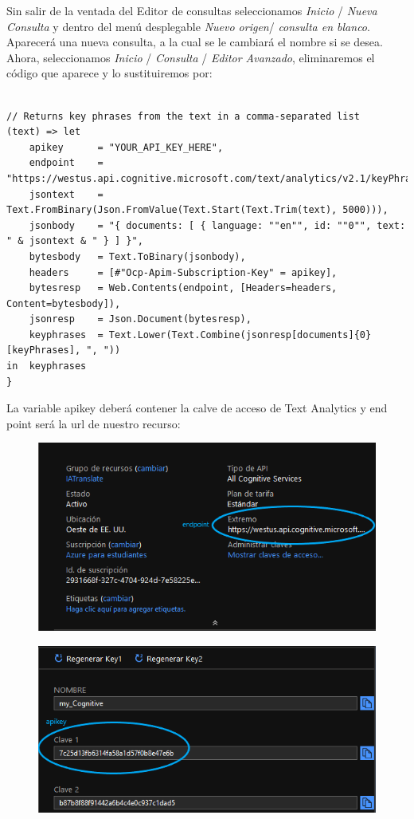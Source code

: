 \documentclass[runningheads]{llncs}
\begin{document}
Sin salir de la ventada del Editor de consultas seleccionamos \textit{Inicio} / \textit{Nueva Consulta} y dentro del menú desplegable \textit{Nuevo origen}/ \textit{consulta en blanco}. Aparecerá una nueva consulta, a la cual se le cambiará el nombre si se desea.
Ahora, seleccionamos \textit{Inicio} / \textit{Consulta} / \textit{Editor Avanzado}, eliminaremos el código que aparece y lo sustituiremos por:
\small{
\begin{verbatim}

// Returns key phrases from the text in a comma-separated list
(text) => let
    apikey      = "YOUR_API_KEY_HERE",
    endpoint    = "https://westus.api.cognitive.microsoft.com/text/analytics/v2.1/keyPhrases",
    jsontext    = Text.FromBinary(Json.FromValue(Text.Start(Text.Trim(text), 5000))),
    jsonbody    = "{ documents: [ { language: ""en"", id: ""0"", text: " & jsontext & " } ] }",
    bytesbody   = Text.ToBinary(jsonbody),
    headers     = [#"Ocp-Apim-Subscription-Key" = apikey],
    bytesresp   = Web.Contents(endpoint, [Headers=headers, Content=bytesbody]),
    jsonresp    = Json.Document(bytesresp),
    keyphrases  = Text.Lower(Text.Combine(jsonresp[documents]{0}[keyPhrases], ", "))
in  keyphrases
}
\end{verbatim}
}
La variable apikey deberá contener la calve de acceso de Text Analytics y end point será la url de nuestro recurso: 
\begin{figure}[H]
\centering
\includegraphics[scale=0.25]{./IA/AZURE/infoCog.png}
\end{figure}
\begin{figure}[H]
\centering
\includegraphics[scale=0.25]{./IA/AZURE/keyconf.png}
\end{figure}
\end{document}
